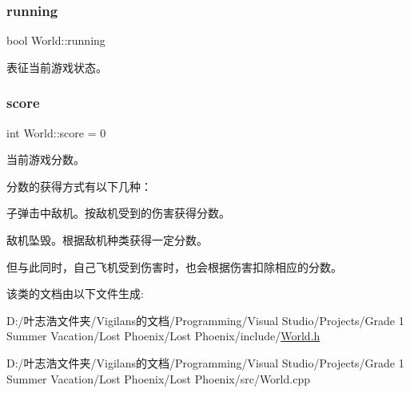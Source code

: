 \subsubsection{\texorpdfstring{running}{running}}
{\footnotesize\ttfamily bool World\+::running\hspace{0.3cm}{\ttfamily [private]}}



表征当前游戏状态。 

\mbox{\label{class_world_ae70b4ef5dd9cb9e7336169a25aaee39c}} 
\subsubsection{\texorpdfstring{score}{score}}
{\footnotesize\ttfamily int World\+::score = 0}



当前游戏分数。 

分数的获得方式有以下几种：
\begin{DoxyEnumerate}
\item 子弹击中敌机。按敌机受到的伤害获得分数。
\item 敌机坠毁。根据敌机种类获得一定分数。
\end{DoxyEnumerate}

但与此同时，自己飞机受到伤害时，也会根据伤害扣除相应的分数。 

该类的文档由以下文件生成\+:\begin{DoxyCompactItemize}
\item 
D\+:/叶志浩文件夹/\+Vigilans的文档/\+Programming/\+Visual Studio/\+Projects/\+Grade 1 Summer Vacation/\+Lost Phoenix/\+Lost Phoenix/include/\hyperlink{_world_8h}{World.\+h}\item 
D\+:/叶志浩文件夹/\+Vigilans的文档/\+Programming/\+Visual Studio/\+Projects/\+Grade 1 Summer Vacation/\+Lost Phoenix/\+Lost Phoenix/src/World.\+cpp\end{DoxyCompactItemize}
